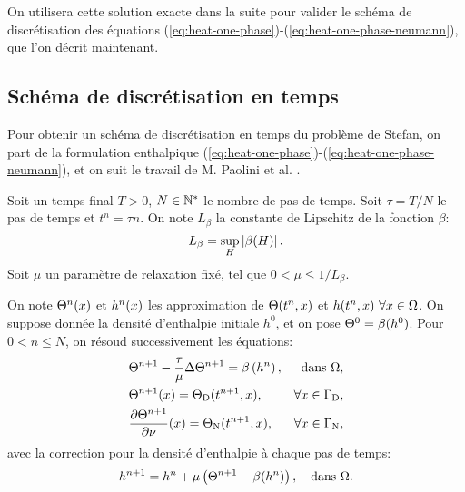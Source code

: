 On utilisera cette solution exacte dans la suite pour valider le schéma de
discrétisation des équations
(\ref{eq:heat-one-phase})-(\ref{eq:heat-one-phase-neumann}), que l'on
décrit maintenant.

\subsection*{Schéma de discrétisation en temps}
Pour obtenir un schéma de discrétisation en temps du problème de
Stefan, on part de la formulation enthalpique
(\ref{eq:heat-one-phase})-(\ref{eq:heat-one-phase-neumann}), et on
suit le travail de M. Paolini et al. \cite{Paolini1988}.

Soit un temps final $T > 0$, $N\in \mathbb {\mathbb N^*}$ le nombre de pas de
temps. Soit $\tau = T / N$ le pas de temps et $t^n = \tau n$. On note
$L_\beta$ la constante de Lipschitz de la fonction $\beta$:
\begin{equation}
  L_\beta = \sup_{H}\left\lvert \beta(H) \right\rvert.
\end{equation}
Soit $\mu$ un paramètre de relaxation fixé, tel que $0 < \mu \leq
1/L_\beta$.

On note $\Theta^n(x)$ et $h^n(x)$ les approximation
de $\Theta(t^n, x)$ et $h(t^n, x)\ \forall x\in
\Omega$.  On suppose donnée la densité d'enthalpie initiale $h^0$, et
on pose $\Theta^0 = \beta(h^0)$. Pour $0 < n \leq N$, on résoud
successivement les équations:
\begin{align}
  &\temperature^{n+1} - \frac{\tau}{\mu} \Delta \temperature^{n+1} = %
  \beta\parent{\enthalpydensity^n}, & \text{dans } \Omega,\label{eq:chernoff-heat}\\
  &\temperature^{n+1}(x) = \temperature_{\mathrm D}(t^{n+1}, x), &
  \forall x\in%
  \Gamma_\mathrm{D},\label{eq:chernoff-dirichlet}\\
  &\frac{\partial\temperature^{n+1}}{\partial \nu}(x) = %
  \temperature_\mathrm{N}(t^{n+1}, x), %
  & \forall x \in \Gamma_\mathrm{N},\label{eq:chernoff-neumann}
\end{align}
avec la correction pour la densité d'enthalpie à chaque pas de temps:
\begin{equation}\label{eq:chernoff-update}
h^{n+1} = h^{n} +
\mu\left( \Theta^{n+1} - \beta(h^{n}) \right), \quad
\text{dans } \Omega.
\end{equation}


